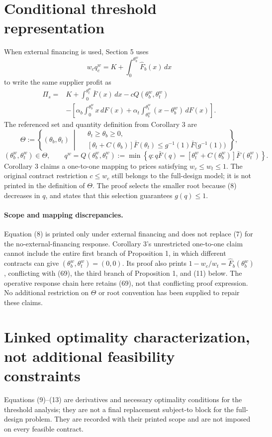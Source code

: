 \documentclass{article}
\begin{document}
\section*{Conditional threshold representation}
When external financing is used, Section 5 uses
\[
w_cq_c^w=K+\int_0^{\theta_b^w}\hat F_b(x)\,dx
\]
to write the same supplier profit as
\begin{equation}
\begin{aligned}
\Pi_s={}&K+\int_0^{\theta_t^w}\bar F(x)\,dx-cQ(\theta_b^w,\theta_t^w)\\
&-\left[\alpha_b\int_0^{\theta_b^w}x\,dF(x)
+\alpha_t\int_{\theta_b^w}^{\theta_t^w}(x-\theta_b^w)\,dF(x)\right].
\end{aligned}\tag{8}
\end{equation}
The referenced set and quantity definition from Corollary 3 are
\[
\Theta:=\left\{(\theta_b,\theta_t)\;\middle|\;
\begin{aligned}
&\theta_t\geq\theta_b\geq0,\\
&[\theta_t+C(\theta_b)]\bar F(\theta_t)
 \leq g^{-1}(1)\bar F\bigl(g^{-1}(1)\bigr)
\end{aligned}\right\},
\]
\[
(\theta_b^w,\theta_t^w)\in\Theta,
\qquad
q^w=Q(\theta_b^w,\theta_t^w)
:=\min\left\{q:q\bar F(q)
 =[\theta_t^w+C(\theta_b^w)]\bar F(\theta_t^w)\right\}.
\]
Corollary 3 claims a one-to-one mapping to prices satisfying $w_c\leq w_t\leq1$. The original contract restriction $c\leq w_c$ still belongs to the full-design model; it is not printed in the definition of $\Theta$. The proof selects the smaller root because (8) decreases in $q$, and states that this selection guarantees $g(q)\leq1$.

\paragraph{Scope and mapping discrepancies.}
Equation (8) is printed only under external financing and does not replace (7) for the no-external-financing response. Corollary 3's unrestricted one-to-one claim cannot include the entire first branch of Proposition 1, in which different contracts can give $(\theta_b^w,\theta_t^w)=(0,0)$. Its proof also prints $1-w_c/w_t=\hat F_b(\theta_b^w)$, conflicting with (69), the third branch of Proposition 1, and (11) below. The operative response chain here retains (69), not that conflicting proof expression. No additional restriction on $\Theta$ or root convention has been supplied to repair these claims.

\section*{Linked optimality characterization, not additional feasibility constraints}
Equations (9)--(13) are derivatives and necessary optimality conditions for the threshold analysis; they are not a final replacement subject-to block for the full-design problem. They are recorded with their printed scope and are not imposed on every feasible contract.
\end{document}
